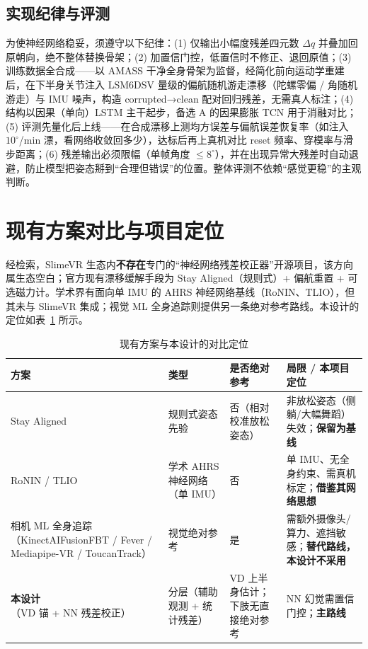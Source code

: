 \documentclass[scheme=plain,UTF8,11pt,a4paper]{ctexart}
\begin{document}
\subsection{实现纪律与评测}
\label{subsec:discipline}

为使神经网络稳妥，须遵守以下纪律：(1) 仅输出小幅度残差四元数 $\Delta q$ 并叠加回原朝向，绝不整体替换骨架；(2) 加置信门控，低置信时不修正、退回原值；(3) 训练数据全合成——以 AMASS 干净全身骨架为监督，经简化前向运动学重建后，在下半身关节注入 LSM6DSV 量级的偏航随机游走漂移（陀螺零偏 / 角随机游走）与 IMU 噪声，构造 corrupted→clean 配对回归残差，无需真人标注；(4) 结构以因果（单向）LSTM 主干起步，备选 A 的因果膨胀 TCN 用于消融对比；(5) 评测先量化后上线——在合成漂移上测均方误差与偏航误差恢复率（如注入 $10^{\circ}$/min 漂，看网络收敛回多少），达标后再上真机对比 reset 频率、穿模率与滑步距离；(6) 残差输出必须限幅（单帧角度 $\le 8^{\circ}$），并在出现异常大残差时自动退避，防止模型把姿态掰到“合理但错误”的位置。整体评测不依赖“感觉更稳”的主观判断。
\section{现有方案对比与项目定位}
\label{sec:compare}

经检索，SlimeVR 生态内\textbf{不存在}专门的“神经网络残差校正器”开源项目，该方向属生态空白；官方现有漂移缓解手段为 Stay Aligned（规则式）+ 偏航重置 + 可选磁力计。学术界有面向单 IMU 的 AHRS 神经网络基线（RoNIN、TLIO），但其未与 SlimeVR 集成；视觉 ML 全身追踪则提供另一条绝对参考路线。本设计的定位如表~\ref{tab:compare} 所示。

\begin{table}[H]
\centering
\small
\caption{现有方案与本设计的对比定位}
\label{tab:compare}
\begin{tabular}{p{3.0cm}p{2.6cm}p{2.0cm}p{4.0cm}}
\toprule
\textbf{方案} & \textbf{类型} & \textbf{是否绝对参考} & \textbf{局限 / 本项目定位} \\
\midrule
Stay Aligned & 规则式姿态先验 & 否（相对校准放松姿态） & 非放松姿态（侧躺/大幅舞蹈）失效；\textbf{保留为基线} \\
RoNIN / TLIO & 学术 AHRS 神经网络（单 IMU） & 否 & 单 IMU、无全身约束、需真机标定；\textbf{借鉴其网络思想} \\
相机 ML 全身追踪（KinectAIFusionFBT / Fever / Mediapipe-VR / ToucanTrack） & 视觉绝对参考 & 是 & 需额外摄像头/算力、遮挡敏感；\textbf{替代路线，本设计不采用} \\
\textbf{本设计}（VD 锚 + NN 残差校正） & 分层（辅助观测 + 统计残差） & VD 上半身估计；下肢无直接绝对参考 & NN 幻觉需置信门控；\textbf{主路线} \\
\bottomrule
\end{tabular}
\end{table}
\end{document}
